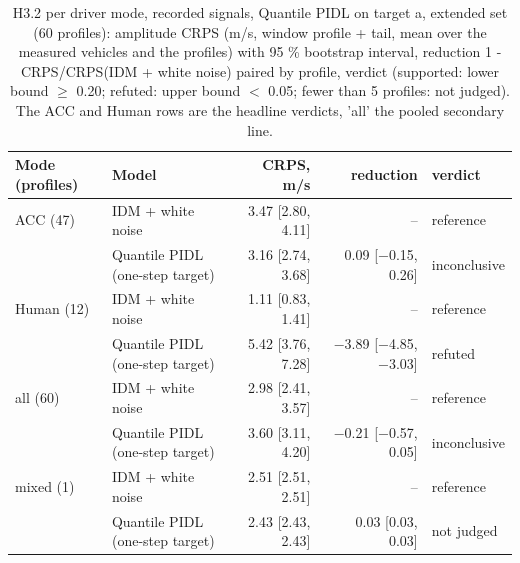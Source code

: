 \begin{table}[htbp]
\centering
\small
\caption{H3.2 per driver mode, recorded signals, Quantile PIDL on target a, extended set (60 profiles): amplitude CRPS (m/s, window profile + tail, mean over the measured vehicles and the profiles) with 95 \% bootstrap interval, reduction 1 - CRPS/CRPS(IDM + white noise) paired by profile, verdict (supported: lower bound $\geq$ 0.20; refuted: upper bound $<$ 0.05; fewer than 5 profiles: not judged). The ACC and Human rows are the headline verdicts, 'all' the pooled secondary line.}
\label{tab:t5-h32--e3--raw-a}
\begin{tabular}{llrrl}
\toprule
Mode (profiles) & Model & CRPS, m/s & reduction & verdict \\
\midrule
ACC (47) & IDM + white noise & 3.47 [2.80, 4.11] & -- & reference \\
 & Quantile PIDL (one-step target) & 3.16 [2.74, 3.68] & 0.09 [$-$0.15, 0.26] & inconclusive \\
\midrule
Human (12) & IDM + white noise & 1.11 [0.83, 1.41] & -- & reference \\
 & Quantile PIDL (one-step target) & 5.42 [3.76, 7.28] & $-$3.89 [$-$4.85, $-$3.03] & refuted \\
\midrule
all (60) & IDM + white noise & 2.98 [2.41, 3.57] & -- & reference \\
 & Quantile PIDL (one-step target) & 3.60 [3.11, 4.20] & $-$0.21 [$-$0.57, 0.05] & inconclusive \\
\midrule
mixed (1) & IDM + white noise & 2.51 [2.51, 2.51] & -- & reference \\
 & Quantile PIDL (one-step target) & 2.43 [2.43, 2.43] & 0.03 [0.03, 0.03] & not judged \\
\bottomrule
\end{tabular}
\end{table}
